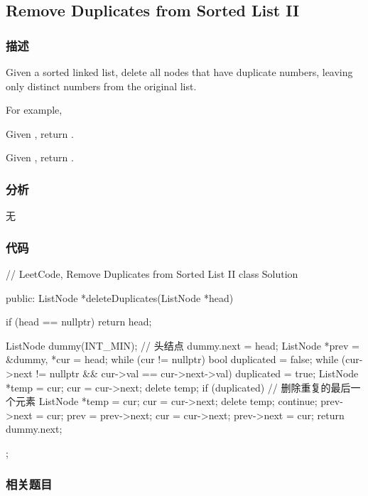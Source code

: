 \subsection{Remove Duplicates from Sorted List II}
\label{sec:remove-duplicates-from-sorted-list-ii}


\subsubsection{描述}
Given a sorted linked list, delete all nodes that have duplicate numbers, leaving only distinct numbers from the original list.

For example,

Given , return .

Given , return .


\subsubsection{分析}
无


\subsubsection{代码}
\begin{Code}
// LeetCode, Remove Duplicates from Sorted List II
class Solution {
public:
    ListNode *deleteDuplicates(ListNode *head) {
        if (head == nullptr) return head;

        ListNode dummy(INT_MIN); // 头结点
        dummy.next = head;
        ListNode *prev = &dummy, *cur = head;
        while (cur != nullptr) {
            bool duplicated = false;
            while (cur->next != nullptr && cur->val == cur->next->val) {
                duplicated = true;
                ListNode *temp = cur;
                cur = cur->next;
                delete temp;
            }
            if (duplicated) { // 删除重复的最后一个元素
                ListNode *temp = cur;
                cur = cur->next;
                delete temp;
                continue;
            }
            prev->next = cur;
            prev = prev->next;
            cur = cur->next;
        }
        prev->next = cur;
        return dummy.next;
    }
};
\end{Code}


\subsubsection{相关题目}

